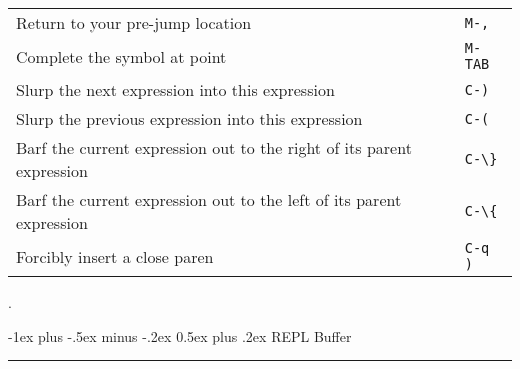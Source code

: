 \documentclass[12pt,landscape]{article}
\makeatletter
\renewcommand{\section}{\@startsection{section}{1}{0mm}%
                                {-1ex plus -.5ex minus -.2ex}%
                                {0.5ex plus .2ex}%
                                {\normalfont\large\bfseries}}
\makeatother
\begin{document}
\begin{multicols}{3}
\begin{tabular}{p{6cm}p{1cm}}
	Return to your pre-jump location & \verb!M-,! \\
	Complete the symbol at point & \verb!M-TAB! \\
	Slurp the next expression into this expression & \verb!C-)! \\
	Slurp the previous expression into this expression & \verb!C-(! \\
	Barf the current expression out to the right of its parent expression & \verb!C-\}! \\
	Barf the current expression out to the left of its parent expression & \verb!C-\{! \\
	Forcibly insert a close paren & \verb!C-q )! \\ 
	
\end{tabular}

\vfill
\columnbreak


\begin{center}
	
\end{center}.

\section{REPL Buffer}\smallskip \hrule height 2pt \smallskip
\begin{tabular}{p{6cm}p{1cm}} %


\end{tabular}
\end{multicols}
\end{document}
